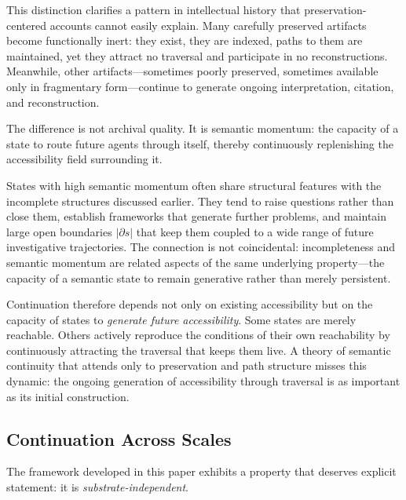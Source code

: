 \documentclass[12pt]{article}
\begin{document}
This distinction clarifies a pattern in intellectual history that
preservation-centered accounts cannot easily explain.
Many carefully preserved artifacts become functionally inert: they exist,
they are indexed, paths to them are maintained, yet they attract no
traversal and participate in no reconstructions.
Meanwhile, other artifacts---sometimes poorly preserved, sometimes
available only in fragmentary form---continue to generate ongoing
interpretation, citation, and reconstruction.

The difference is not archival quality.
It is semantic momentum: the capacity of a state to route future agents
through itself, thereby continuously replenishing the accessibility field
surrounding it.

States with high semantic momentum often share structural features with
the incomplete structures discussed earlier.
They tend to raise questions rather than close them, establish frameworks
that generate further problems, and maintain large open boundaries
$|\partial s|$ that keep them coupled to a wide range of future
investigative trajectories.
The connection is not coincidental: incompleteness and semantic momentum
are related aspects of the same underlying property---the capacity of a
semantic state to remain generative rather than merely persistent.

Continuation therefore depends not only on existing accessibility but on
the capacity of states to \emph{generate future accessibility}.
Some states are merely reachable.
Others actively reproduce the conditions of their own reachability by
continuously attracting the traversal that keeps them live.
A theory of semantic continuity that attends only to preservation and
path structure misses this dynamic: the ongoing generation of
accessibility through traversal is as important as its initial
construction.

\subsection{Continuation Across Scales}

The framework developed in this paper exhibits a property that deserves
explicit statement: it is \emph{substrate-independent}.
\end{document}
